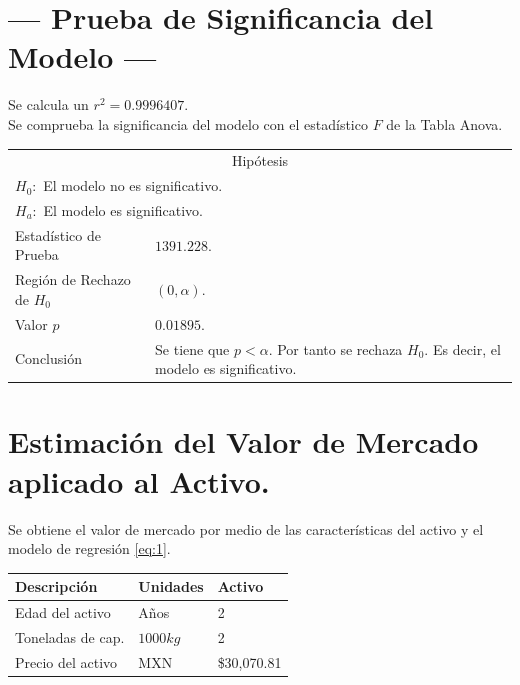 \documentclass{article}
\begin{document}
\section{\centering --- Prueba de Significancia del Modelo ---} %
Se calcula un \(r ^ 2 = 0.9996407\). \\ 
Se comprueba la significancia del modelo con el estadístico \(F\) de la Tabla Anova.
\begin{center}
  \begin{tabular}{|l|p{6cm}|}
    \cline{1-2}
    \multicolumn{2}{|c|}{Hipótesis}\\ \cline{1-2}
    \multicolumn{2}{|l|}{\(H_0:\) El modelo no es significativo.} \\ 
    \multicolumn{2}{|l|}{\(H_a:\) El modelo es significativo.} \\ \cline{1-2}
    Estadístico de Prueba & \(1391.228\).\\ \cline{1-2} 
		Región de Rechazo de \(H_0\) & \((0, \alpha )\).\\ \cline{1-2} 
    Valor \(p\) & \(0.01895\).\\ \cline{1-2} 
    Conclusión & Se tiene que \(p<\alpha\). \newline 
		Por tanto se rechaza \(H_0\). \newline 
		Es decir, el modelo es significativo.\\ \cline{1-2} 
  \end{tabular}
\end{center} 

\section{\centering Estimación del Valor de Mercado aplicado al Activo.} %
Se obtiene el valor de mercado por medio de las características del activo y el modelo de regresión \eqref{eq:1}.
\begin{center}
  \begin{tabular}{|l|l|l|}
    \hline 
		Descripción   & Unidades  & Activo \\ \hline 
    Edad del activo    & Años      & 2      \\ \hline 
		Toneladas de cap.  & \(1000kg\) & 2   \\ \hline 
		Precio del activo   & MXN       & \$30,070.81  \\ \hline 
  \end{tabular}
\end{center} 
\end{document}
